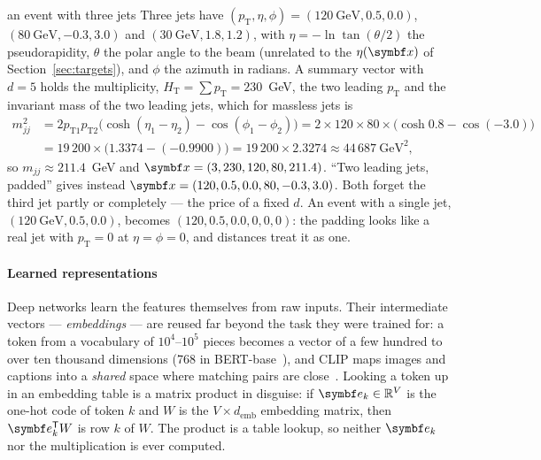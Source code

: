 \documentclass[11pt]{article}
\begin{document}
\begin{worked}{an event with three jets}
Three jets have $(p_{\mathrm T}, \eta, \phi) = (120~\text{GeV}, 0.5, 0.0)$, $(80~\text{GeV}, -0.3, 3.0)$ and
$(30~\text{GeV}, 1.8, 1.2)$, with $\eta = -\ln\tan(\theta/2)$ the pseudorapidity, $\theta$ the polar angle to the
beam (unrelated to the $\eta(\x)$ of Section~\ref{sec:targets}), and $\phi$ the azimuth in radians. A summary vector with $d = 5$ holds the multiplicity, $H_{\mathrm T} = \sum
p_{\mathrm T} = 230$~GeV, the two leading $p_{\mathrm T}$ and the invariant mass of the two leading jets, which for
massless jets is
\begin{align*}
  m_{jj}^2 &= 2 p_{\mathrm T 1} p_{\mathrm T 2}\big(\cosh(\eta_1 - \eta_2) - \cos(\phi_1 - \phi_2)\big)
  = 2 \times 120 \times 80 \times \big(\cosh 0.8 - \cos(-3.0)\big) \\
  &= 19\,200 \times \big(1.3374 - (-0.9900)\big) = 19\,200 \times 2.3274 \approx 44\,687~\text{GeV}^2 ,
\end{align*}
so $m_{jj} \approx 211.4$~GeV and $\x = (3, 230, 120, 80, 211.4)$. ``Two leading jets, padded'' gives instead
$\x = (120, 0.5, 0.0, 80, -0.3, 3.0)$. Both forget the third jet partly or completely --- the price of a fixed $d$.
An event with a single jet, $(120~\text{GeV}, 0.5, 0.0)$, becomes $(120, 0.5, 0.0, 0, 0, 0)$: the padding looks like
a real jet with $p_{\mathrm T} = 0$ at $\eta = \phi = 0$, and distances treat it as one.
\end{worked}

\paragraph{Learned representations} Deep networks learn the features themselves from raw inputs. Their intermediate
vectors --- \emph{embeddings} --- are reused far beyond the task they were trained for: a token from a vocabulary of
$10^4$--$10^5$ pieces becomes a vector of a few hundred to over ten thousand dimensions (768 in
BERT-base~\cite{devlin2019}), and CLIP maps images and captions into a \emph{shared} space where matching pairs are
close~\cite{radford2021}. Looking a token up in an embedding table is a matrix product in disguise: if $\vect{e}_k
\in \R^V$ is the one-hot code of token $k$ and $W$ is the $V \times d_{\mathrm{emb}}$ embedding matrix, then
$\vect{e}_k\T W$ is row $k$ of $W$. The product is a table lookup, so neither $\vect{e}_k$ nor the multiplication is
ever computed.
\end{document}
